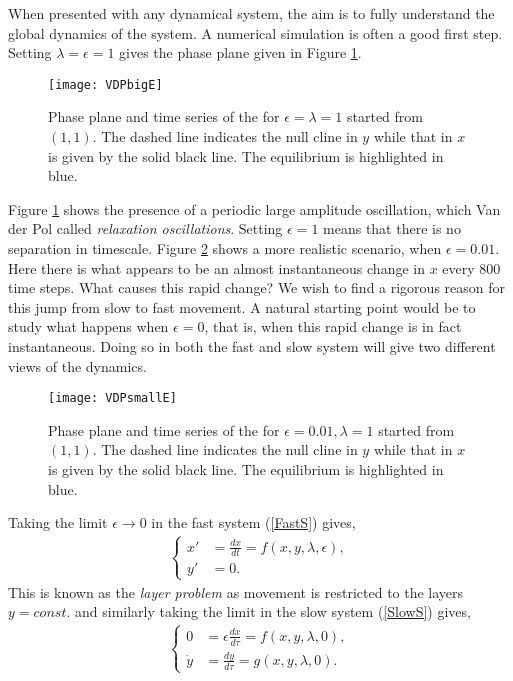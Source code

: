 When presented with any dynamical system, the aim is to fully understand the global dynamics of the system. A numerical simulation is often a good first step. Setting $\lambda=\epsilon=1$ gives the phase plane given in Figure \ref{fig:VDPE1}.
\begin{figure}[]
	\texttt{[image: VDPbigE]}
	\caption[Van der Pol Dynamics with \texorpdfstring{$\epsilon=1$}{eps=1}]{Phase plane and time series of the \vdp for $\epsilon=\lambda=1$ started from $(1,1)$. The dashed line indicates the null cline in $y$ while that in $x$ is given by the solid black line. The equilibrium is highlighted in blue.}
	\label{fig:VDPE1}
\end{figure}
Figure \ref{fig:VDPE1} shows the presence of a  periodic large amplitude oscillation, which Van der Pol called \emph{relaxation oscillations}. Setting $\epsilon=1$ means that there is no separation in timescale. Figure \ref{fig:VDPE01} shows a more realistic scenario, when $\epsilon=0.01$. Here there is what appears to be an almost instantaneous change in $x$ every 800 time steps. What causes this rapid change? We wish to find a rigorous reason for this jump from slow to fast movement. A natural starting point would be to study what happens when $\epsilon=0$, that is, when this rapid change is in fact instantaneous. Doing so in both the fast and slow system will give two different views of the dynamics.
\begin{figure}[]
	\texttt{[image: VDPsmallE]}
	\caption[Van der Pol Dynamics with \texorpdfstring{$\epsilon=0.01$}{eps=0.1}]{Phase plane and time series of the \vdp for $\epsilon=0.01, \lambda=1$ started from $(1,1)$. The dashed line indicates the null cline in $y$ while that in $x$ is given by the solid black line. The equilibrium is highlighted in blue.}
	\label{fig:VDPE01}
\end{figure}
 Taking the limit $\epsilon \to 0$ in the fast system (\ref{FastS}) gives, \begin{align} \label{FastS0}
		\begin{cases}
			x' &=\frac{dx}{dt}= f(x,y,\lambda, \epsilon),\\
			y' &= 0.
		\end{cases}
	\end{align}
This is known as the \emph{layer problem} as movement is restricted to the layers $y=const.$ and similarly taking the limit in the slow system (\ref{SlowS}) gives,
	\begin{align}\label{SlowS0}
		\begin{cases}
			0 &= \epsilon \frac{dx}{d \tau} = f(x,y,\lambda, 0),\\
			\dot{y} & = \frac{dy}{d \tau} =  g( x,y, \lambda,0).
		\end{cases}
	\end{align}
